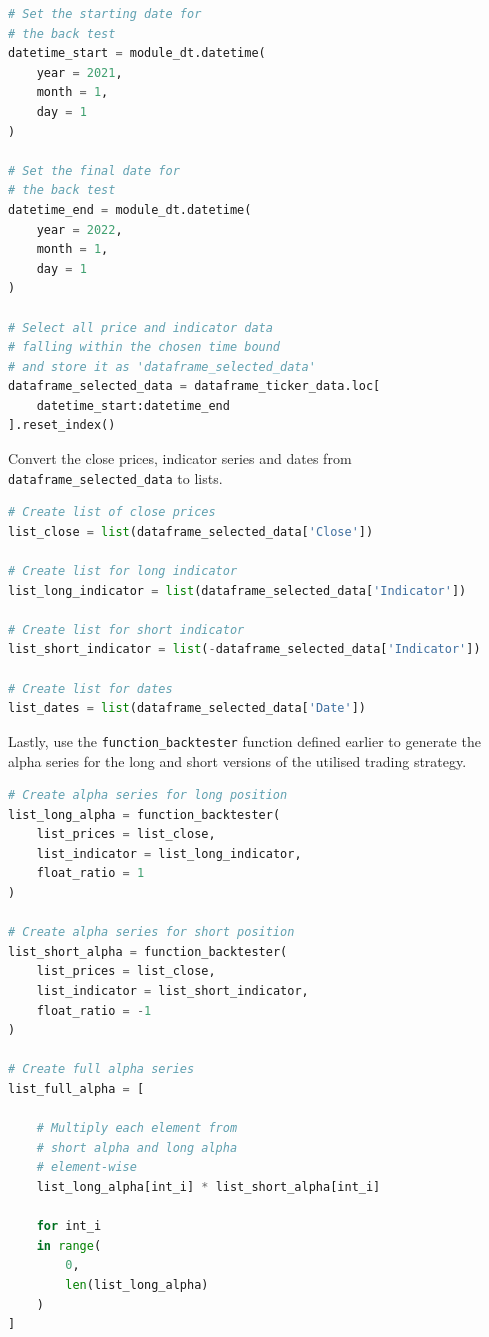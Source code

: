 \documentclass[11pt]{article}
\begin{document}
\begin{lstlisting}[language=Python]
# Set the starting date for
# the back test
datetime_start = module_dt.datetime(
    year = 2021,
    month = 1,
    day = 1
)

# Set the final date for
# the back test
datetime_end = module_dt.datetime(
    year = 2022,
    month = 1,
    day = 1
)

# Select all price and indicator data
# falling within the chosen time bound
# and store it as 'dataframe_selected_data'
dataframe_selected_data = dataframe_ticker_data.loc[
    datetime_start:datetime_end
].reset_index()
\end{lstlisting}

Convert the close prices, indicator series and dates from \texttt{dataframe\_selected\_data} to lists.

\begin{lstlisting}[language=Python]
# Create list of close prices
list_close = list(dataframe_selected_data['Close'])

# Create list for long indicator
list_long_indicator = list(dataframe_selected_data['Indicator'])

# Create list for short indicator
list_short_indicator = list(-dataframe_selected_data['Indicator'])

# Create list for dates
list_dates = list(dataframe_selected_data['Date'])
\end{lstlisting}

Lastly, use the \texttt{function\_backtester} function defined earlier to generate the alpha series for the long and short versions of the utilised trading strategy.

\begin{lstlisting}[language=Python]
# Create alpha series for long position
list_long_alpha = function_backtester(
    list_prices = list_close,
    list_indicator = list_long_indicator,
    float_ratio = 1
)

# Create alpha series for short position
list_short_alpha = function_backtester(
    list_prices = list_close,
    list_indicator = list_short_indicator,
    float_ratio = -1
)

# Create full alpha series
list_full_alpha = [

    # Multiply each element from
    # short alpha and long alpha
    # element-wise
    list_long_alpha[int_i] * list_short_alpha[int_i]

    for int_i
    in range(
        0,
        len(list_long_alpha)
    )
]
\end{lstlisting}
\end{document}
